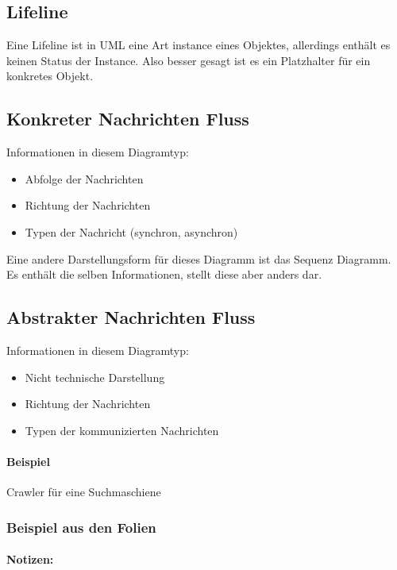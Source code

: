 \subsection{Lifeline}
Eine Lifeline ist in UML eine Art instance eines Objektes, allerdings enthält es keinen Status der Instance. Also besser gesagt ist es ein Platzhalter für ein konkretes Objekt.

\subsection{Konkreter Nachrichten Fluss}
Informationen in diesem Diagramtyp:

\begin{itemize}
\item Abfolge der Nachrichten
\item Richtung der Nachrichten
\item Typen der Nachricht (synchron, asynchron)
\end{itemize}

Eine andere Darstellungsform für dieses Diagramm ist das Sequenz Diagramm. Es enthält die selben Informationen, stellt diese aber anders dar.

\subsection{Abstrakter Nachrichten Fluss}
Informationen in diesem Diagramtyp:

\begin{itemize}
\item Nicht technische Darstellung
\item Richtung der Nachrichten
\item Typen der kommunizierten Nachrichten
\end{itemize}

\paragraph{Beispiel} Crawler für eine Suchmaschiene

\subsubsection{Beispiel aus den Folien}


\paragraph{Notizen:}

